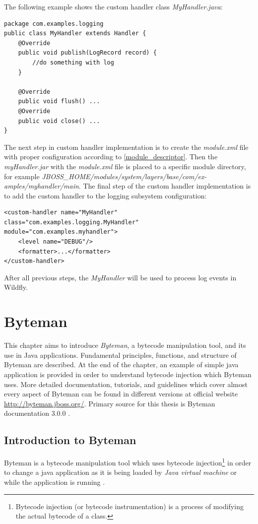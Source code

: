 \documentclass[12pt,oneside]{fithesis2}
\begin{document}
\newpage
The following example shows the custom handler class \textit{MyHandler.java}:
\begin{lstlisting}[caption = Custom handler class, label = custom_handler_class, style=eclipse_java]
package com.examples.logging
public class MyHandler extends Handler {
	@Override
	public void publish(LogRecord record) {
		//do something with log
	}
	
	@Override
	public void flush() ...
	@Override
	public void close() ...
}
\end{lstlisting}
\noindent
The next step in custom handler implementation is to create the \textit{module.xml} file with proper configuration according to \ref{module_descriptor}. Then the \textit{myHandler.jar} with the \textit{module.xml} file is placed to a specific module directory, for example \textit{JBOSS\_HOME/modules/system/layers/base/com/ex-amples/myhandler/main}.
\noindent
The final step of the custom handler implementation is to add the custom handler to the logging subsystem configuration:
\begin{lstlisting}[caption = Adding custom handler to the logging subsystem configuration, label = custom_handler_logging_subsystem, style=my_xml]
<custom-handler name="MyHandler" class="com.examples.logging.MyHandler" module="com.examples.myhandler">
	<level name="DEBUG"/>
	<formatter>...</formatter>
</custom-handler>
\end{lstlisting}
\noindent

After all previous steps, the \textit{MyHandler} will be used to process log events in Wildfly.

\chapter{Byteman}
\label{byteman_chap}
This chapter aims to introduce \textit{Byteman}, a bytecode manipulation tool, and its use in Java applications. Fundamental principles, functions, and structure of Byteman are described.
At the end of the chapter, an example of simple java application is provided in order to understand bytecode injection which Byteman uses. More detailed documentation, tutorials, and guidelines 
which cover almost every aspect of Byteman can be found in different versions at official website \url{http://byteman.jboss.org/}. Primary source for this thesis is Byteman documentation 3.0.0 \cite{byteman_doc}.

\section{Introduction to Byteman}
Byteman is a bytecode manipulation tool which uses bytecode injection\footnote{Bytecode injection (or bytecode instrumentation) is a process of modifying the actual bytecode of a class.} in order to change a java application as it is being loaded by \textit{Java virtual machine} or while the application is running \cite[Introduction to Byteman]{byteman_doc}.
\end{document}
